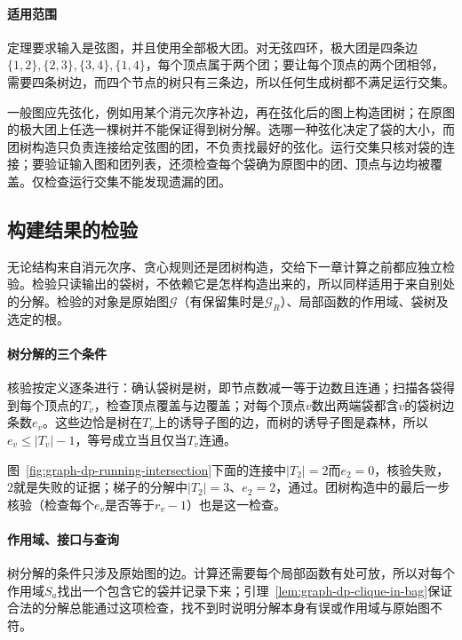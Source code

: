 \paragraph{适用范围}
定理要求输入是弦图，并且使用全部极大团。对无弦四环，极大团是四条边$\{1,2\},\allowbreak\{2,3\},\allowbreak\{3,4\},\allowbreak\{1,4\}$，每个顶点属于两个团；要让每个顶点的两个团相邻，需要四条树边，而四个节点的树只有三条边，所以任何生成树都不满足运行交集。

一般图应先弦化，例如用某个消元次序补边，再在弦化后的图上构造团树；在原图的极大团上任选一棵树并不能保证得到树分解。选哪一种弦化决定了袋的大小，而团树构造只负责连接给定弦图的团，不负责找最好的弦化。运行交集只核对袋的连接；要验证输入图和团列表，还须检查每个袋确为原图中的团、顶点与边均被覆盖。仅检查运行交集不能发现遗漏的团。

\subsection{构建结果的检验}
\label{sec:graph-dp-construction-check}

无论结构来自消元次序、贪心规则还是团树构造，交给下一章计算之前都应独立检验。检验只读输出的袋树，不依赖它是怎样构造出来的，所以同样适用于来自别处的分解。检验的对象是原始图$\mathcal G$（有保留集时是$\mathcal G_R$）、局部函数的作用域、袋树及选定的根。

\paragraph{树分解的三个条件}
核验按定义逐条进行：确认袋树是树，即节点数减一等于边数且连通；扫描各袋得到每个顶点的$T_v$，检查顶点覆盖与边覆盖；对每个顶点$v$数出两端袋都含$v$的袋树边条数$e_v$。这些边恰是树在$T_v$上的诱导子图的边，而树的诱导子图是森林，所以$e_v\leq|T_v|-1$，等号成立当且仅当$T_v$连通。

图~\ref{fig:graph-dp-running-intersection}下面的连接中$|T_2|=2$而$e_2=0$，核验失败，$2$就是失败的证据；梯子的分解中$|T_2|=3$、$e_2=2$，通过。团树构造中的最后一步核验（检查每个$e_v$是否等于$r_v-1$）也是这一检查。

\paragraph{作用域、接口与查询}
树分解的条件只涉及原始图的边。计算还需要每个局部函数有处可放，所以对每个作用域$S_a$找出一个包含它的袋并记录下来；引理~\ref{lem:graph-dp-clique-in-bag}保证合法的分解总能通过这项检查，找不到时说明分解本身有误或作用域与原始图不符。

